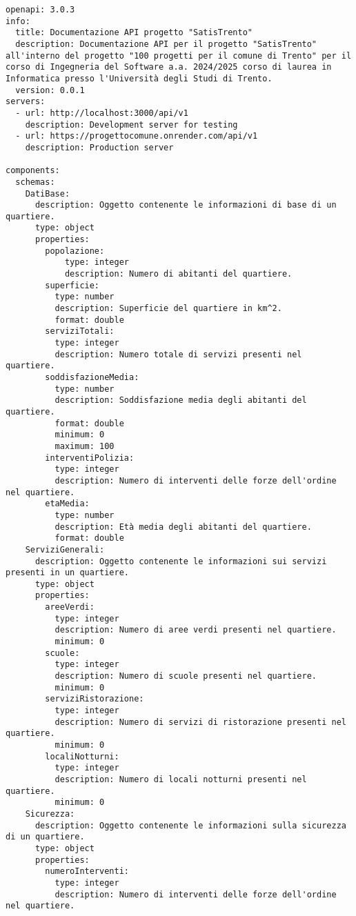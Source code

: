 \begin{verbatim}
openapi: 3.0.3
info:
  title: Documentazione API progetto "SatisTrento"
  description: Documentazione API per il progetto "SatisTrento" all'interno del progetto "100 progetti per il comune di Trento" per il corso di Ingegneria del Software a.a. 2024/2025 corso di laurea in Informatica presso l'Università degli Studi di Trento.
  version: 0.0.1
servers:
  - url: http://localhost:3000/api/v1
    description: Development server for testing
  - url: https://progettocomune.onrender.com/api/v1
    description: Production server

components:
  schemas:
    DatiBase:
      description: Oggetto contenente le informazioni di base di un quartiere.
      type: object
      properties:
        popolazione:
            type: integer
            description: Numero di abitanti del quartiere.
        superficie:
          type: number
          description: Superficie del quartiere in km^2.
          format: double
        serviziTotali: 
          type: integer
          description: Numero totale di servizi presenti nel quartiere.
        soddisfazioneMedia:
          type: number
          description: Soddisfazione media degli abitanti del quartiere.
          format: double
          minimum: 0
          maximum: 100
        interventiPolizia: 
          type: integer
          description: Numero di interventi delle forze dell'ordine nel quartiere.
        etaMedia:
          type: number
          description: Età media degli abitanti del quartiere.
          format: double
    ServiziGenerali:
      description: Oggetto contenente le informazioni sui servizi presenti in un quartiere.
      type: object
      properties:
        areeVerdi:
          type: integer
          description: Numero di aree verdi presenti nel quartiere.
          minimum: 0
        scuole:
          type: integer
          description: Numero di scuole presenti nel quartiere.
          minimum: 0
        serviziRistorazione:
          type: integer
          description: Numero di servizi di ristorazione presenti nel quartiere.
          minimum: 0
        localiNotturni: 
          type: integer
          description: Numero di locali notturni presenti nel quartiere.
          minimum: 0
    Sicurezza:
      description: Oggetto contenente le informazioni sulla sicurezza di un quartiere.
      type: object
      properties:
        numeroInterventi:
          type: integer
          description: Numero di interventi delle forze dell'ordine nel quartiere.

\end{verbatim}
